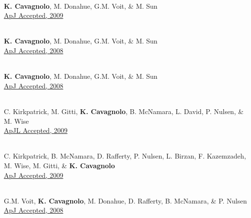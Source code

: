 \documentclass[12pt]{cv}
\begin{document}
\begin{llist}
{}\\
{\bf K. Cavagnolo}, M. Donahue, G.M. Voit, \& M. Sun\\
\href{http://adsabs.harvard.edu/abs/2009ApJS..182...12C}{ApJ Accepted, 2009}

{}\\
{\bf K. Cavagnolo}, M. Donahue, G.M. Voit, \& M. Sun\\
\href{http://adsabs.harvard.edu/abs/2008ApJ...683L.107C}{ApJ Accepted, 2008}

{}\\
{\bf K. Cavagnolo}, M. Donahue, G.M. Voit, \& M. Sun\\
\href{http://adsabs.harvard.edu/abs/2008ApJ...682..821C}{ApJ Accepted, 2008}



{}\\
C. Kirkpatrick, M. Gitti, {\bf K. Cavagnolo}, B. McNamara, L. David, P. Nulsen, \& M. Wise\\
\href{http://adsabs.harvard.edu/abs/2009arXiv0909.2252K}{ApJL Accepted, 2009}

{}\\
C. Kirkpatrick, B. McNamara, D. Rafferty, P. Nulsen, L. Birzan, F. Kazemzadeh, M. Wise, M. Gitti, \& {\bf K. Cavagnolo}\\
\href{http://adsabs.harvard.edu/abs/2009ApJ...697..867K}{ApJ Accepted, 2009}

{}\\
G.M. Voit, {\bf K. Cavagnolo}, M. Donahue, D. Rafferty, B. McNamara, \& P. Nulsen\\
\href{http://adsabs.harvard.edu/abs/2008ApJ...681L...5V}{ApJ Accepted, 2008}


\end{llist}
\end{document}
